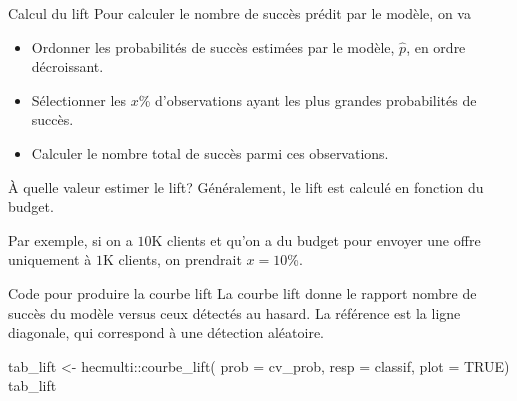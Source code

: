 \documentclass[
  ignorenonframetext,
]{beamer}
\newenvironment{Shaded}{\begin{snugshade}}{\end{snugshade}}
\newcommand{\AttributeTok}[1]{\textcolor[rgb]{0.40,0.45,0.13}{#1}}
\newcommand{\ConstantTok}[1]{\textcolor[rgb]{0.56,0.35,0.01}{#1}}
\newcommand{\FunctionTok}[1]{\textcolor[rgb]{0.28,0.35,0.67}{#1}}
\newcommand{\NormalTok}[1]{\textcolor[rgb]{0.00,0.23,0.31}{#1}}
\newcommand{\OtherTok}[1]{\textcolor[rgb]{0.00,0.23,0.31}{#1}}
\newcommand{\SpecialCharTok}[1]{\textcolor[rgb]{0.37,0.37,0.37}{#1}}
\providecommand{\tightlist}{%
  \setlength{\itemsep}{0pt}\setlength{\parskip}{0pt}}\usepackage{longtable,booktabs,array}
\begin{document}
\begin{frame}{Calcul du lift}
\label{calcul-du-lift}
Pour calculer le nombre de succès prédit par le modèle, on va

\begin{itemize}
\tightlist
\item
  Ordonner les probabilités de succès estimées par le modèle,
  \(\widehat{p}\), en ordre décroissant.
\item
  Sélectionner les \(x\)\% d'observations ayant les plus grandes
  probabilités de succès.
\item
  Calculer le nombre total de succès parmi ces observations.
\end{itemize}
\end{frame}

\begin{frame}{À quelle valeur estimer le lift?}
\label{uxe0-quelle-valeur-estimer-le-lift}
Généralement, le lift est calculé en fonction du budget.

Par exemple, si on a \(10\)K clients et qu'on a du budget pour envoyer
une offre uniquement à \(1\)K clients, on prendrait \(x\)\(=10\)\%.
\end{frame}

\begin{frame}[fragile]{Code pour produire la courbe lift}
\label{code-pour-produire-la-courbe-lift}
La courbe lift donne le rapport nombre de succès du modèle versus ceux
détectés au hasard. La référence est la ligne diagonale, qui correspond
à une détection aléatoire.

\begin{Shaded}
\begin{Highlighting}[numbers=left,,]
\NormalTok{tab\_lift }\OtherTok{\textless{}{-}}\NormalTok{ hecmulti}\SpecialCharTok{::}\FunctionTok{courbe\_lift}\NormalTok{(}
  \AttributeTok{prob =}\NormalTok{ cv\_prob,}
  \AttributeTok{resp =}\NormalTok{ classif, }
  \AttributeTok{plot =} \ConstantTok{TRUE}\NormalTok{)}
\NormalTok{tab\_lift}
\end{Highlighting}
\end{Shaded}
\end{frame}
\end{document}
